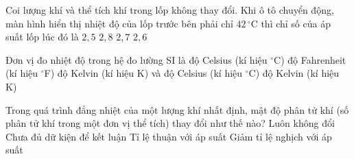 \begin{ex}
\begin{center}
\begin{minipage}[c]{0.46\linewidth}
			\end{minipage}
		\end{center}
		Coi lượng khí và thể tích khí trong lốp không thay đổi. Khi ô tô chuyển động, màn hình hiển thị nhiệt độ của lốp trước bên phải chỉ $42\,^\circ\text{C}$ thì chỉ số của áp suất lốp lúc đó là
		\choice
		{$2{,}5$}
		{$2{,}8$}
		{$2{,}7$}
		{\True $2{,}6$}
	\end{ex}

	\begin{ex}%
		Đơn vị đo nhiệt độ trong hệ đo lường SI là
		\choice
		{độ Celsius (kí hiệu $^\circ$C)}
		{độ Fahrenheit (kí hiệu $^\circ$F)}
		{độ Kelvin (kí hiệu K) và độ Celsius (kí hiệu $^\circ$C)}
		{\True độ Kelvin (kí hiệu K)}
	\end{ex}

	\begin{ex}%
		Trong quá trình đẳng nhiệt của một lượng khí nhất định, mật độ phân tử khí (số phân tử khí trong một đơn vị thể tích) thay đổi như thế nào?
		\choice
		{Luôn không đổi}
		{Chưa đủ dữ kiện để kết luận}
		{\True Tỉ lệ thuận với áp suất}
		{Giảm tỉ lệ nghịch với áp suất}
	\end{ex}

